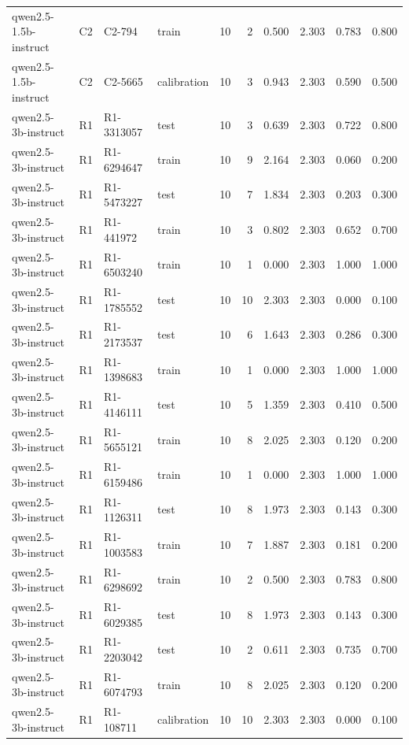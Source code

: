 \begin{table}
\begin{tabular}{llllrrrrrr}
qwen2.5-1.5b-instruct & C2 & C2-794 & train & 10 & 2 & 0.500 & 2.303 & 0.783 & 0.800 \\
qwen2.5-1.5b-instruct & C2 & C2-5665 & calibration & 10 & 3 & 0.943 & 2.303 & 0.590 & 0.500 \\
qwen2.5-3b-instruct & R1 & R1-3313057 & test & 10 & 3 & 0.639 & 2.303 & 0.722 & 0.800 \\
qwen2.5-3b-instruct & R1 & R1-6294647 & train & 10 & 9 & 2.164 & 2.303 & 0.060 & 0.200 \\
qwen2.5-3b-instruct & R1 & R1-5473227 & test & 10 & 7 & 1.834 & 2.303 & 0.203 & 0.300 \\
qwen2.5-3b-instruct & R1 & R1-441972 & train & 10 & 3 & 0.802 & 2.303 & 0.652 & 0.700 \\
qwen2.5-3b-instruct & R1 & R1-6503240 & train & 10 & 1 & 0.000 & 2.303 & 1.000 & 1.000 \\
qwen2.5-3b-instruct & R1 & R1-1785552 & test & 10 & 10 & 2.303 & 2.303 & 0.000 & 0.100 \\
qwen2.5-3b-instruct & R1 & R1-2173537 & test & 10 & 6 & 1.643 & 2.303 & 0.286 & 0.300 \\
qwen2.5-3b-instruct & R1 & R1-1398683 & train & 10 & 1 & 0.000 & 2.303 & 1.000 & 1.000 \\
qwen2.5-3b-instruct & R1 & R1-4146111 & test & 10 & 5 & 1.359 & 2.303 & 0.410 & 0.500 \\
qwen2.5-3b-instruct & R1 & R1-5655121 & train & 10 & 8 & 2.025 & 2.303 & 0.120 & 0.200 \\
qwen2.5-3b-instruct & R1 & R1-6159486 & train & 10 & 1 & 0.000 & 2.303 & 1.000 & 1.000 \\
qwen2.5-3b-instruct & R1 & R1-1126311 & test & 10 & 8 & 1.973 & 2.303 & 0.143 & 0.300 \\
qwen2.5-3b-instruct & R1 & R1-1003583 & train & 10 & 7 & 1.887 & 2.303 & 0.181 & 0.200 \\
qwen2.5-3b-instruct & R1 & R1-6298692 & train & 10 & 2 & 0.500 & 2.303 & 0.783 & 0.800 \\
qwen2.5-3b-instruct & R1 & R1-6029385 & test & 10 & 8 & 1.973 & 2.303 & 0.143 & 0.300 \\
qwen2.5-3b-instruct & R1 & R1-2203042 & test & 10 & 2 & 0.611 & 2.303 & 0.735 & 0.700 \\
qwen2.5-3b-instruct & R1 & R1-6074793 & train & 10 & 8 & 2.025 & 2.303 & 0.120 & 0.200 \\
qwen2.5-3b-instruct & R1 & R1-108711 & calibration & 10 & 10 & 2.303 & 2.303 & 0.000 & 0.100 \\

\end{tabular}
\end{table}

